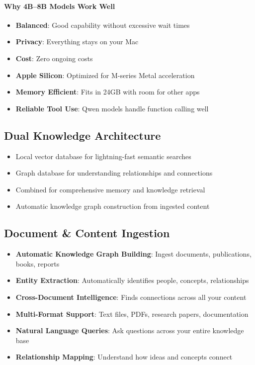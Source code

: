 \documentclass[11pt,letterpaper]{article}
\begin{document}
\paragraph{Why 4B--8B Models Work Well}
\begin{itemize}[leftmargin=*]
    \item \textbf{Balanced}: Good capability without excessive wait times
    \item \textbf{Privacy}: Everything stays on your Mac
    \item \textbf{Cost}: Zero ongoing costs
    \item \textbf{Apple Silicon}: Optimized for M-series Metal acceleration
    \item \textbf{Memory Efficient}: Fits in 24GB with room for other apps
    \item \textbf{Reliable Tool Use}: Qwen models handle function calling well
\end{itemize}

\subsection{Dual Knowledge Architecture}
\begin{itemize}[leftmargin=*]
    \item Local vector database for lightning-fast semantic searches
    \item Graph database for understanding relationships and connections
    \item Combined for comprehensive memory and knowledge retrieval
    \item Automatic knowledge graph construction from ingested content
\end{itemize}

\subsection{Document \& Content Ingestion}
\begin{itemize}[leftmargin=*]
    \item \textbf{Automatic Knowledge Graph Building}: Ingest documents, publications, books, reports
    \item \textbf{Entity Extraction}: Automatically identifies people, concepts, relationships
    \item \textbf{Cross-Document Intelligence}: Finds connections across all your content
    \item \textbf{Multi-Format Support}: Text files, PDFs, research papers, documentation
    \item \textbf{Natural Language Queries}: Ask questions across your entire knowledge base
    \item \textbf{Relationship Mapping}: Understand how ideas and concepts connect
\end{itemize}
\end{document}
